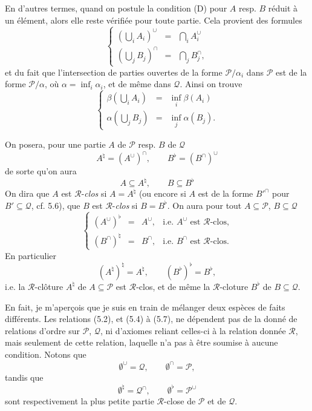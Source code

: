 \documentclass[11pt]{article}
\newcommand{\printedpage}[1]{\marginpar{\footnotesize p.~#1}}
\newcommand{\msp}[1]{\marginpar{\footnotesize [#1]}}
\newcommand{\cP}{\mathcal{P}}
\newcommand{\cQ}{\mathcal{Q}}
\newcommand{\cR}{\mathcal{R}}
\begin{document}
En d'autres termes, quand on postule la condition (D) pour $A$ resp. $B$ réduit à un élément, alors elle reste vérifiée pour toute partie. Cela provient des formules
\[
\left\{
\begin{array}{lcl}
(\bigcup_i A_i)^\cup & = & \bigcap_i A_i^\cup \\[1ex]
(\bigcup_j B_j)^\cap & = & \bigcap_j B_j^\cap,
\end{array}
\right.
\tag*{(5.2)}
\]
et du fait que l'intersection de parties ouvertes de la forme $\mathcal{P}/\alpha_i$ dans $\mathcal{P}$ est de la forme $\mathcal{P}/\alpha$, où $\alpha = \inf_i \alpha_i$, et de même dans $\mathcal{Q}$. Ainsi on trouve
\[
\left\{
\begin{array}{lcl}
\beta(\bigcup_i A_i) & = & \inf_i \beta(A_i) \\[1ex]
\alpha(\bigcup_j B_j) & = & \inf_j \alpha(B_j).
\end{array}
\right.
\tag*{(5.3)}
\]

\printedpage{44}

On posera, pour une partie $A$ de $\cP$ resp. $B$ de $\cQ$
\[
A^{\natural} = (A^{\cup})^{\cap}, \qquad B^{\flat} = (B^{\cap})^{\cup}
\tag*{(5.4)}
\]
de sorte qu'on aura
\[
A \subseteq A^{\natural}, \qquad B \subseteq B^{\flat}
\tag*{(5.5)}
\]
On dira que $A$ est $\cR$-\textit{clos} si $A = A^{\natural}$ (ou encore si $A$ est de la forme $B'^{\cap}$ pour $B' \subseteq \cQ$, cf. 5.6), que
\msp{71}
$B$ est $\cR$-\textit{clos} si $B = B^{\flat}$. On aura pour tout $A \subseteq \cP$, $B \subseteq \cQ$
\[
\left\{
\begin{array}{rcll}
(A^{\cup})^{\flat} & = & A^{\cup}, & \text{i.e. } A^{\cup} \text{ est } \cR\text{-clos,}\\[1ex]
(B^{\cap})^{\natural} & = & B^{\cap}, & \text{i.e. } B^{\cap} \text{ est } \cR\text{-clos.}
\end{array}
\right.
\tag*{(5.6)}
\]
En particulier
\[
(A^{\natural})^{\natural} = A^{\natural}, \qquad (B^{\flat})^{\flat} = B^{\flat},
\tag*{(5.7)}
\]
i.e. la $\cR$-clôture $A^{\natural}$ de $A \subseteq \cP$ est $\cR$-clos, et de même la $\cR$-cloture $B^{\flat}$ de $B \subseteq \cQ$. %

En fait, je m'aperçois que je suis en train de mélanger deux espèces de faits différents. Les relations (5.2), et (5.4) à (5.7), ne dépendent pas de la donné de relations d'ordre sur $\cP$, $\cQ$, ni d'axiomes reliant celles-ci à la relation donnée $\cR$, mais seulement de cette relation, laquelle n'a pas à être soumise à aucune condition. Notons que %
\[
\emptyset^{\cup} = \cQ, \qquad \emptyset^{\cap} = \cP,
\tag*{(5.8)}
\]
tandis que
\[
\emptyset^{\natural} = \cQ^{\cap}, \qquad \emptyset^{\flat} = \cP^{\cup}
\tag*{(5.9)}
\]
sont respectivement la plus petite partie $\cR$-close de $\cP$ et de $\cQ$.
\end{document}
